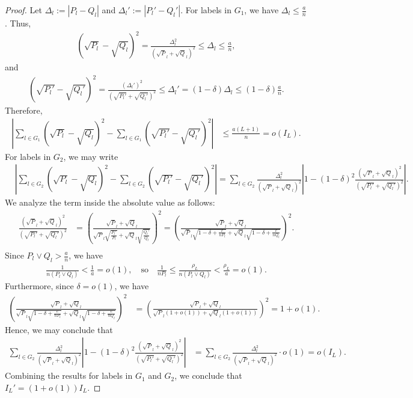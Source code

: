 \documentclass{article}
\begin{document}
\begin{proof}
Let $\Delta_l := |P_l - Q_l|$ and $\Delta_l' := |P_l' - Q_l'|$. For labels in $G_1$, we have $\Delta_l \leq \frac{a}{n}$. Thus,
\begin{align*}
(\sqrt{P_l} - \sqrt{Q_l})^2 = \frac{\Delta_l^2}{(\sqrt P_l + \sqrt Q_l)^2} \leq \Delta_l \leq \frac{a}{n},
\end{align*}
and
\begin{align*}
(\sqrt{P_l'} - \sqrt{Q_l'})^2 = \frac{(\Delta_l')^2}{(\sqrt {P_l'} + \sqrt {Q_l'})^2} \leq \Delta_l' = (1-\delta)\Delta_l \leq (1-\delta) \frac{a}{n}.
\end{align*}
Therefore,
\begin{align*}
\left | \sum_{l \in G_1} (\sqrt{P_l} - \sqrt{Q_l})^2 - \sum_{l \in G_1} (\sqrt{P_l'} - \sqrt{Q_l'})^2 \right | & \leq \frac{a(L+1)}{n} = o(I_L).
\end{align*}
For labels in $G_2$, we may write
\begin{align*}
&\left | \sum_{l \in G_2} (\sqrt{P_l} - \sqrt{Q_l})^2 - \sum_{l \in G_2} (\sqrt{P_l'} - \sqrt{Q_l'})^2 \right | = \sum_{l \in G_2} \frac{\Delta_l^2}{(\sqrt P_l + \sqrt Q_l)^2} \left | 1 - (1-\delta)^2\frac{(\sqrt P_l + \sqrt Q_l)^2}{(\sqrt{P_l'} + \sqrt{Q_l'})^2} \right |.
\end{align*}
We analyze the term inside the absolute value as follows:
\begin{align*}
\frac{(\sqrt P_l + \sqrt Q_l)^2}{(\sqrt{P_l'} + \sqrt{Q_l'})^2} &= \left(\frac{\sqrt P_l + \sqrt Q_l}{\sqrt P_l \sqrt{\frac{P_l'}{P_l}} + \sqrt Q_l \sqrt{\frac{Q_l'}{Q_l}}}\right)^2 =  \left(\frac{\sqrt P_l + \sqrt Q_l}{\sqrt P_l \sqrt{1-\delta + \frac{c}{nP_l}} + \sqrt Q_l \sqrt{1-\delta + \frac{c}{nQ_l}}}\right)^2.\\
\end{align*}
Since $P_l \vee Q_l > \frac{a}{n}$, we have
\begin{align*}
\frac{1}{n(P_l \vee Q_l)} < \frac{1}{a} = o(1), \quad \text{so} \quad \frac{1}{nP_l} \leq \frac{\rho_L}{n(P_l \vee Q_l)} < \frac{\rho_L}{a} = o(1).
\end{align*}
Furthermore, since $\delta = o(1)$, we have
\begin{align*}
\left(\frac{\sqrt P_l + \sqrt Q_l}{\sqrt P_l \sqrt{1-\delta + \frac{c}{nP_l}} + \sqrt Q_l \sqrt{1-\delta + \frac{c}{nQ_l}}}\right)^2 &= \left(\frac{\sqrt P_l + \sqrt Q_l}{\sqrt P_l (1+o(1)) + \sqrt Q_l (1+o(1))}\right)^2 = 1+o(1).
\end{align*}
Hence, we may conclude that
\begin{align*}
 \sum_{l \in G_2} \frac{\Delta_l^2}{(\sqrt P_l + \sqrt Q_l)^2} \left | 1 - (1-\delta)^2\frac{(\sqrt P_l + \sqrt Q_l)^2}{(\sqrt{P_l'} + \sqrt{Q_l'})^2} \right | &=  \sum_{l \in G_2} \frac{\Delta_l^2}{(\sqrt P_l + \sqrt Q_l)^2} \cdot o(1) = o(I_L).
\end{align*}
Combining the results for labels in $G_1$ and $G_2$, we conclude that $I_L' = (1+o(1)) I_L.$
\end{proof}
\end{document}
